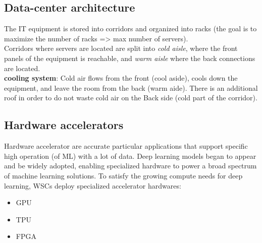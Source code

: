 \documentclass[10pt, oneside]{article}
\begin{document}
\subsection{Data-center architecture}
The IT equipment is stored into corridors and organized into racks (the goal is to maximize the number of racks => max number of servers).\\
Corridors where servers are located are split into \emph{cold aisle}, where the front panels of the equipment is reachable, and \emph{warm aisle} where the back connections are located.\\
{\bf cooling system}: Cold air flows from the front (cool aside), cools down the equipment, and leave the room from the back (warm aide). There is an additional roof in order to do not waste cold air on the Back side (cold part of the corridor).
\newline
\subsection{Hardware accelerators}
Hardware accelerator are accurate particular applications that support specific high operation (of ML) with a lot of data.
Deep learning models began to appear and be widely adopted, enabling specialized hardware to power a broad spectrum of machine learning solutions. To satisfy the growing compute needs for deep learning, WSCs deploy specialized accelerator hardwares:
\begin{itemize}
    \item GPU
    \item TPU
    \item FPGA
\end{itemize}
\end{document}

